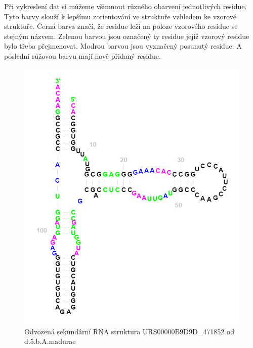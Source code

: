 Při vykreslení dat si můžeme všimnout různého obarvení jednotlivých residue.
Tyto barvy slouží k lepšímu zorientování ve struktuře vzhledem ke vzorové
struktuře. Černá barva značí, že residue leží na poloze vzorového residue se
stejným názvem. Zelenou barvou jsou označený ty residue jejiž vzorový residue
bylo třeba přejmenovat. Modrou barvou jsou vyznačený posunutý residue. A poslední
růžovou barvu mají nově přidaný residue.

\begin{figure}[H]
  \centering
  \includegraphics[width=145mm]{../img/inputDataColors.png}
  \caption{Odvozená sekundární RNA struktura URS00000B9D9D_471852 od d.5.b.A.madurae}
\end{figure}

